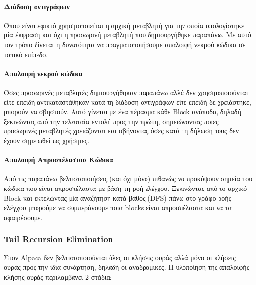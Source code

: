 \documentclass[12pt]{article}
\begin{document}
\paragraph{Διάδοση αντιγράφων}
Όπου είναι εφικτό χρησιμοποιείται η αρχική μεταβλητή για την οποία υπολογίστηκε μία έκφραση και όχι η προσωρινή μεταβλητή που δημιουργήθηκε παραπάνω. Με αυτό τον τρόπο δίνεται η δυνατότητα να πραγματοποιήσουμε απαλοιφή νεκρού κώδικα σε τοπικό επίπεδο.
\paragraph{Απαλοιφή νεκρού κώδικα}
Όσες προσωρινές μεταβλητές δημιουργήθηκαν παραπάνω αλλά δεν χρησιμοποιούνται είτε επειδή αντικαταστάθηκαν κατά τη διάδοση αντιγράφων είτε επειδή δε χρειάστηκε, μπορούν να σβηστούν. Αυτό γίνεται με ένα πέρασμα κάθε Block ανάποδα, δηλαδή ξεκινώντας από την τελευταία εντολή προς την πρώτη, σημειώνοντας ποιες προσωρινές μεταβλητές χρειάζονται και σβήνοντας όσες κατά τη δήλωση τους δεν έχουν σημειωθεί ως χρήσιμες.
\paragraph{Απαλοιφή Απροσπέλαστου Κώδικα}
Από τις παραπάνω βελτιστοποιήσεις (και όχι μόνο) πιθανώς να προκύψουν σημεία του κώδικα που είναι απροσπέλαστα με βάση τη ροή ελέγχου. Ξεκινώντας από το αρχικό Block και εκτελώντας μία αναζήτηση κατά βάθος (DFS) πάνω στο γράφο ροής ελέγχου μπορούμε να συμπεράνουμε ποια blocks είναι απροσπέλαστα και να τα αφαιρέσουμε.
\subsubsection{Tail Recursion Elimination}
Στον Alpaca δεν βελτιστοποιούνται όλες οι κλήσεις ουράς αλλά μόνο οι κλήσεις ουράς προς την ίδια συνάρτηση, δηλαδή οι αναδρομικές. Η υλοποίηση της απαλοιφής κλήσης ουράς περιλαμβάνει 2 στάδια:
\end{document}
